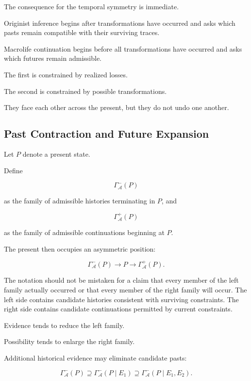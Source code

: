 \documentclass[
  11pt,
  a4paper,
  DIV=12,
  BCOR=0mm,
  parskip=half-
]{scrartcl}
\newcommand{\Adm}{\mathcal A}
\theoremstyle{definition}
\theoremstyle{plain}
\theoremstyle{remark}
\begin{document}
The consequence for the temporal symmetry is immediate.

Originist inference begins after transformations have occurred and asks which
pasts remain compatible with their surviving traces.

Macrolife continuation begins before all transformations have occurred and
asks which futures remain admissible.

The first is constrained by realized losses.

The second is constrained by possible transformations.

They face each other across the present, but they do not undo one another.


\subsection{Past Contraction and Future Expansion}
\label{sec:two-cones}

Let \(P\) denote a present state.

Define

\[
  \Gamma^{-}_{\Adm}(P)
\]

as the family of admissible histories terminating in \(P\), and

\[
  \Gamma^{+}_{\Adm}(P)
\]

as the family of admissible continuations beginning at \(P\).

The present then occupies an asymmetric position:

\[
  \Gamma^{-}_{\Adm}(P)
  \longrightarrow
  P
  \longrightarrow
  \Gamma^{+}_{\Adm}(P).
\]

The notation should not be mistaken for a claim that every member of the left
family actually occurred or that every member of the right family will occur.
The left side contains candidate histories consistent with surviving
constraints. The right side contains candidate continuations permitted by
current constraints.

Evidence tends to reduce the left family.

Possibility tends to enlarge the right family.

Additional historical evidence may eliminate candidate pasts:

\[
  \Gamma^{-}_{\Adm}(P)
  \supseteq
  \Gamma^{-}_{\Adm}(P\mid E_1)
  \supseteq
  \Gamma^{-}_{\Adm}(P\mid E_1,E_2).
\]
\end{document}
